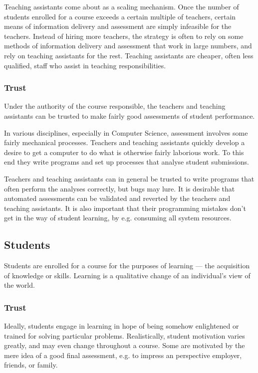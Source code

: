Teaching assistants come about as a scaling mechanism. Once the number of
students enrolled for a course exceeds a certain multiple of teachers, certain
means of information delivery and assessment are simply infeasible for the
teachers. Instead of hiring more teachers, the strategy is often to rely on
some methods of information delivery and assessment that work in large numbers,
and rely on teaching assistants for the rest. Teaching assistants are cheaper,
often less qualified, staff who assist in teaching responsibilities.

\subsubsection{Trust}

Under the authority of the course responsible, the teachers and teaching
assistants can be trusted to make fairly good assessments of student
performance.

In various disciplines, especially in Computer Science, assessment involves
some fairly mechanical processes. Teachers and teaching assistants quickly
develop a desire to get a computer to do what is otherwise fairly laborious
work. To this end they write programs and set up processes that analyse student
submissions.

Teachers and teaching assistants can in general be trusted to write programs
that often perform the analyses correctly, but bugs may lure. It is desirable
that automated assessments can be validated and reverted by the teachers and
teaching assistants. It is also important that their programming mistakes don't
get in the way of student learning, by e.g. consuming all system resources.

\subsection{Students}

Students are enrolled for a course for the purposes of learning --- the
acquisition of knowledge or skills. Learning is a qualitative change of an
individual's view of the world\cite{ramsden-1992}.

\subsubsection{Trust}

Ideally, students engage in learning in hope of being somehow enlightened or
trained for solving particular problems. Realistically, student motivation
varies greatly, and may even change throughout a course. Some are motivated by
the mere idea of a good final assessment, e.g. to impress an perspective
employer, friends, or family.

